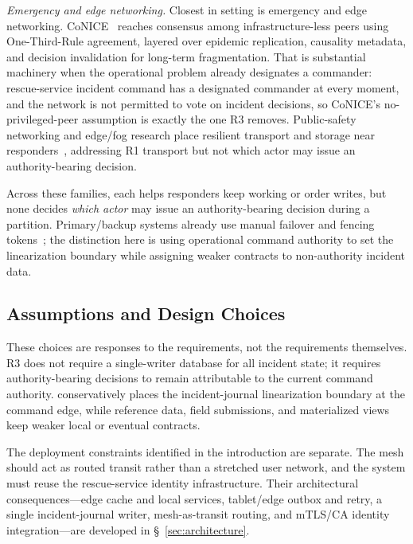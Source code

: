 \textit{Emergency and edge networking.} Closest in setting is emergency and edge
networking. CoNICE~\cite{jahanian2022conice} reaches consensus among
infrastructure-less peers using One-Third-Rule agreement, layered over epidemic
replication, causality metadata, and decision invalidation for long-term
fragmentation. That is substantial machinery when the operational problem already
designates a commander: rescue-service incident command has a designated commander
at every moment, and the network is not permitted to vote on incident decisions,
so CoNICE's no-privileged-peer assumption is exactly the one R3 removes. Public-safety networking and edge/fog
research place resilient
transport and storage near
responders~\cite{kumbhar2015legacy,wang2023overview,sagor2024distressnetng},
addressing R1 transport but not which actor may issue an authority-bearing
decision.

Across these families, each helps responders keep working or order writes, but
none decides \emph{which actor} may issue an authority-bearing decision during a
partition. Primary/backup systems already use manual failover and fencing
tokens~\cite{kleppmann2017ddia}; the distinction here is using operational
command authority to set the linearization boundary while assigning weaker
contracts to non-authority incident data.

\subsection{Assumptions and Design Choices}
\label{sec:assumptions}

These choices are responses to the requirements, not the requirements
themselves. R3 does not require a single-writer database for all incident state;
it requires authority-bearing decisions to remain attributable to the current
command authority. \systemname{} conservatively places the incident-journal
linearization boundary at the command edge, while reference data, field
submissions, and materialized views keep weaker local or eventual contracts. 

The deployment constraints identified in the introduction are separate. The mesh
should act as routed transit rather than a stretched user network, and the system
must reuse the rescue-service identity infrastructure. Their architectural
consequences---edge cache and local services, tablet/edge outbox and retry, a
single incident-journal writer, mesh-as-transit routing, and mTLS/CA identity
integration---are developed in \S~\ref{sec:architecture}.
